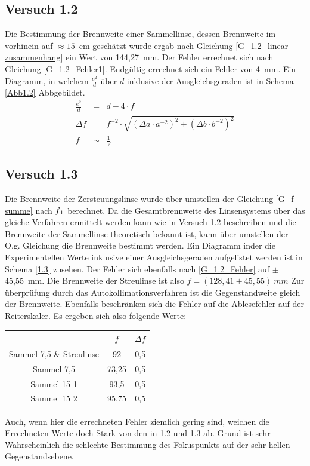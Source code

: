 \documentclass[a4paper, 12pt]{article}
\begin{document}
\subsection{Versuch 1.2}
	Die Bestimmung der Brennweite einer Sammellinse, dessen Brennweite im vorhinein auf $\approx 15$\ cm geschätzt wurde ergab nach Gleichung \ref{G_1.2_linear-zusammenhang} ein Wert von 144,27\ mm. Der Fehler errechnet sich nach Gleichung \ref{G_1.2_Fehler1}. Endgültig errechnet sich ein Fehler von 4\ mm. Ein Diagramm, in welchem $\frac{e^2}{d}$ über $d$ inklusive der Ausgleichsgeraden ist in Schema \ref{Abb1.2} Abbgebildet.
	\begin{eqnarray}
		\frac{e^2}{d}&=&d-4\cdot f \label{G_1.2_linear-zusammenhang}\\
		\Delta f&=&f^{-2}\cdot\sqrt{(\Delta a\cdot a^{-2})^2+(\Delta b\cdot b^{-2})^2} \label{G_1.2_Fehler}\\
		f&\sim &\frac{1}{V}\label{G_Prop_K}
	\end{eqnarray}
\subsection{Versuch 1.3}
Die Brennweite der Zersteuungslinse wurde über umstellen der Gleichung \ref{G_f-summe} nach $f\textsubscript{1}$ berechnet. Da die Gesamtbrennweite des Linsensystems über das gleiche Verfahren ermittelt werden kann wie in Versuch 1.2 beschreiben und die Brennweite der Sammellinse theoretisch bekannt ist, kann über umstellen der O.g. Gleichung die Brennweite bestimmt werden. Ein Diagramm inder die Experimentellen Werte inklusive einer Ausgleichsgeraden aufgelistet werden ist in Schema \ref{1.3} zusehen. Der Fehler sich ebenfalls nach \ref{G_1.2_Fehler} auf $\pm$45,55\ mm. Die Brennweite der Streulinse ist also $f=(128,41\pm45,55)\ mm$ Zur überprüfung durch das Autokollimationsverfahren ist die Gegenstandweite gleich der Brennweite. Ebenfalls beschränken sich die Fehler auf die Ablesefehler auf der Reiterskaler. Es ergeben sich also folgende Werte:\\

	\begin{center}
	\begin{tabular}{c|cc}
 & $f$ & $\Delta f$\\
 \hline
		Sammel 7,5 \& Streulinse &92&0,5\\
		Sammel 7,5 &73,25&0,5\\
		Sammel 15 1&93,5&0,5\\
		Sammel 15 2&95,75&0,5\\
	\end{tabular}
	\end{center}
Auch, wenn hier die errechneten Fehler ziemlich gering sind, weichen die Errechneten Werte doch Stark von den in 1.2 und 1.3 ab. Grund ist sehr Wahrscheinlich die schlechte Bestimmung des Fokuspunkts auf der sehr hellen Gegenstandsebene.
\end{document}
